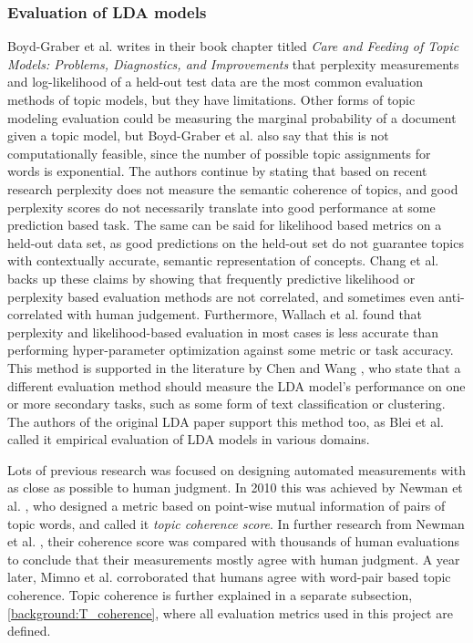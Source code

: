         \subsubsection{Evaluation of LDA models}
            Boyd-Graber et al. \cite{boyd2014care} writes in their book chapter titled \textit{Care and Feeding of Topic Models: Problems, Diagnostics, and Improvements} that perplexity measurements and log-likelihood of a held-out test data are the most common evaluation methods of topic models, but they have limitations. Other forms of topic modeling evaluation could be measuring the marginal probability of a document given a topic model, but Boyd-Graber et al. \cite{boyd2014care} also say that this is not computationally feasible, since the number of possible topic assignments for words is exponential. The authors continue by stating that based on recent research perplexity does not measure the semantic coherence of topics, and good perplexity scores do not necessarily translate into good performance at some prediction based task. The same can be said for likelihood based metrics on a held-out data set, as good predictions on the held-out set do not guarantee topics with contextually accurate, semantic representation of concepts. Chang et al. \cite{chang2009reading} backs up these claims by showing that frequently predictive likelihood or perplexity based evaluation methods are not correlated, and sometimes even anti-correlated with human judgement. Furthermore, Wallach et al. \cite{wallach2009rethinking} found that perplexity and likelihood-based evaluation in most cases is less accurate than performing hyper-parameter optimization against some metric or task accuracy. This method is supported in the literature by Chen and Wang \cite{chen2011latent}, who state that a different evaluation method should measure the LDA model's performance on one or more secondary tasks, such as some form of text classification or clustering. The authors of the original LDA paper support this method too, as Blei et al. \cite{blei2003latent} called it empirical evaluation of LDA models in various domains. 
            
            Lots of previous research was focused on designing automated measurements with as close as possible to human judgment. In 2010 this was achieved by Newman et al. \cite{newman2010visualizing}, who designed a metric based on point-wise mutual information of pairs of topic words, and called it \emph{topic coherence score}. In further research from Newman et al. \cite{newman2010visualizing},\cite{newman2010automatic} their coherence score was compared with thousands of human evaluations to conclude that their measurements mostly agree with human judgment. A year later, Mimno et al. \cite{mimno2011optimizing} corroborated that humans agree with word-pair based topic coherence. Topic coherence is further explained in a separate subsection, \ref{background:T_coherence}, where all evaluation metrics used in this project are defined. 
        
